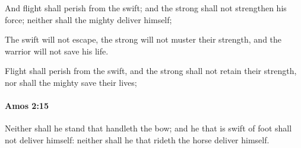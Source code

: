 			\begin{versebox}
					\item[BHS] 
					\item[LXX] 
					\item[ASV] And flight shall perish from the swift; and the strong shall not strengthen his force; neither shall the mighty deliver himself;
					\item[NIV] The swift will not escape, the strong will not muster their strength, and the warrior will not save his life.
					\item[NRSV] Flight shall perish from the swift, and the strong shall not retain their strength, nor shall the mighty save their lives;
			\end{versebox}

		\paragraph{Amos 2:15} %
			\label{AMOS-2-15}

			Neither shall he stand that handleth the bow; and he that is swift of foot shall not deliver himself: neither shall he that rideth the horse deliver himself.

